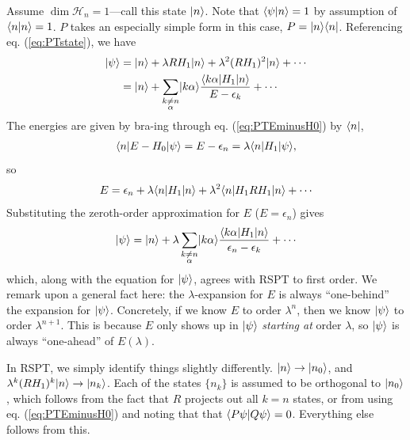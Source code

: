 \documentclass[11pt]{article}
\begin{document}
\begin{eexample}
    Assume $\dim{\mathcal{H}_n} = 1$---call this state $\lvert n\rangle$. Note that
    $\langle \psi | n \rangle = 1$ by assumption of $\langle n | n \rangle = 1$. $P$ takes an
    especially simple form in this case, $P = | n \rangle \langle n |$. Referencing eq. (\ref{eq:PTstate}),
    we have
    \begin{align*}
        \lvert\psi\rangle & = \lvert n\rangle + \lambda R H_1 \lvert n\rangle + \lambda^2 (RH_1)^2 \lvert n\rangle + \cdots\\
        & = \lvert n\rangle + \sum_{\substack{k \neq n \\ \alpha}} \lvert k\alpha\rangle \frac{\langle k\alpha\rvert H_1 \lvert n\rangle}{E - \epsilon_k} + \cdots
    \end{align*}
    The energies are given by bra-ing through eq. (\ref{eq:PTEminusH0})
    by $\langle n\rvert$,
    \begin{align*}
        \langle n\rvert E - H_0 \lvert\psi\rangle = E - \epsilon_n = \lambda \langle n\rvert H_1 \lvert\psi\rangle,
    \end{align*}
    so
    \begin{align*}
        E = \epsilon_n + \lambda \langle n\rvert H_1 \lvert n\rangle + \lambda^2 \langle n\rvert H_1 R H_1 \lvert n\rangle + \cdots
    \end{align*}
    Substituting the zeroth-order approximation for $E$ ($E = \epsilon_n$) gives
    \begin{align*}
        \lvert\psi\rangle = \lvert n\rangle + \lambda \sum_{\substack{k \neq n \\ \alpha}} \lvert k\alpha\rangle \frac{\langle k\alpha\rvert H_1 \lvert n\rangle}{\epsilon_n - \epsilon_k} + \cdots
    \end{align*}
    which, along with the equation for $\lvert\psi\rangle$, agrees with RSPT to first order.
    We remark upon a general fact here: the $\lambda$-expansion for $E$ is always ``one-behind''
    the expansion for $\lvert\psi\rangle$. Concretely, if we know $E$ to order $\lambda^n$,
    then we know $\lvert\psi\rangle$ to order $\lambda^{n + 1}$. This is because $E$ only shows
    up in $\lvert\psi\rangle$ \emph{starting at} order $\lambda$, so $\lvert\psi\rangle$ is always
    ``one-ahead'' of $E(\lambda)$. 

    In RSPT, we simply identify things slightly differently.
    $\lvert n\rangle \to \lvert n_0\rangle$, and $\lambda^k (RH_1)^k \lvert n\rangle \to \lvert n_k\rangle$.
    Each of the states $\{ n_k \}$ is assumed to be orthogonal to $\lvert n_0\rangle$,
    which follows from the fact that $R$ projects out all $k = n$ states,
    or from using eq. (\ref{eq:PTEminusH0}) and noting that that $\langle P\psi | Q\psi \rangle = 0$.
    Everything else follows from this.
\end{eexample}
\end{document}
